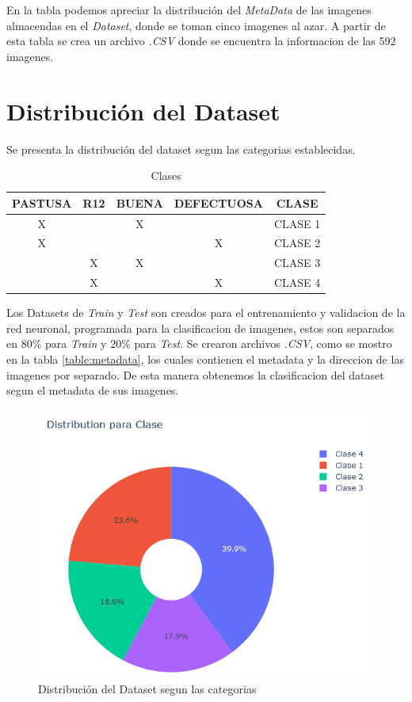 	En la tabla podemos apreciar la distribución del \textit{MetaData} de las imagenes almacendas en el \textit{Dataset}, donde se toman cinco imagenes al azar. A partir de esta tabla se crea un archivo \textit{.CSV} donde se encuentra la informacion de las 592 imagenes.




\newpage

\section{Distribución del Dataset}

	Se presenta la distribución del dataset segun las categorias establecidas.  
	
	\begin{table}[ht]
		\centering
		\begin{tabular}{|c|c|c|c|c|}
			\hline
			PASTUSA & R12 & BUENA & DEFECTUOSA & CLASE \\
			\hline
			X &  & X &  & CLASE 1 \\
			\hline
			X &  &  & X & CLASE 2 \\
			\hline
			  & X & X &  & CLASE 3 \\
			\hline
			  & X &  & X & CLASE 4 \\
			\hline
		\end{tabular}	
		\caption{Clases}
		\label{table:Clases}
	\end{table}
	  
	Los Datasets de \textit{Train} y \textit{Test} son creados para el entrenamiento y validacion de la red neuronal, programada para la clasificacion de imagenes, estos son separados en $80\%$ para \textit{Train} y $20\%$ para \textit{Test}. Se crearon archivos \textit{.CSV}, como se mostro en la tabla \ref{table:metadata}, los cuales contienen el metadata y la direccion de las imagenes por separado. De esta manera obtenemos la clasificacion del dataset segun el metadata de sus imagenes.
	
	\begin{figure}[ht]
		\centering
		\includegraphics[scale=0.6]{Figs/4.png}
		\caption{Distribución del Dataset segun las categorias}
		\label{fig:distribucion}
	\end{figure}


